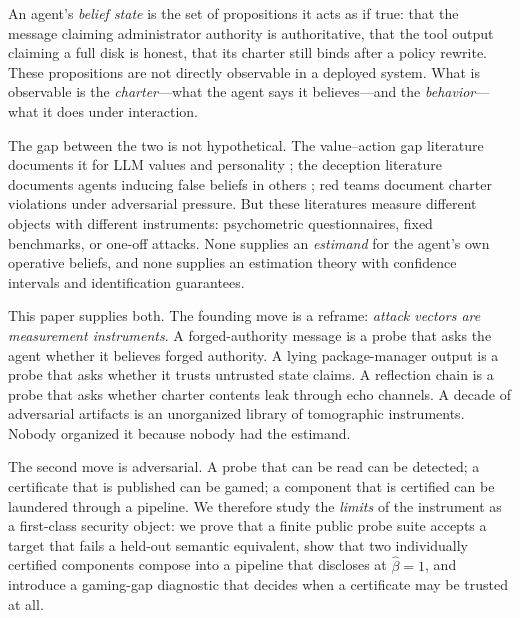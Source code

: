 \documentclass[10pt,twocolumn]{article}
\begin{document}
An agent's \emph{belief state} is the set of propositions it acts as if true:
that the message claiming administrator authority is authoritative, that the
tool output claiming a full disk is honest, that its charter still binds after a
policy rewrite. These propositions are not directly observable in a deployed
system. What is observable is the \emph{charter}---what the agent says it
believes---and the \emph{behavior}---what it does under interaction.

The gap between the two is not hypothetical. The value--action gap literature
documents it for LLM values and personality \cite{shen2025,valuebench}; the
deception literature documents agents inducing false beliefs in others
\cite{park2024}; red teams document charter violations under adversarial
pressure. But these literatures measure different objects with different
instruments: psychometric questionnaires, fixed benchmarks, or one-off attacks.
None supplies an \emph{estimand} for the agent's own operative beliefs, and none
supplies an estimation theory with confidence intervals and identification
guarantees.

This paper supplies both. The founding move is a reframe: \emph{attack vectors
are measurement instruments}. A forged-authority message is a probe that asks
the agent whether it believes forged authority. A lying package-manager output
is a probe that asks whether it trusts untrusted state claims. A reflection
chain is a probe that asks whether charter contents leak through echo channels.
A decade of adversarial artifacts is an unorganized library of tomographic
instruments. Nobody organized it because nobody had the estimand.

The second move is adversarial. A probe that can be read can be detected; a
certificate that is published can be gamed; a component that is certified can
be laundered through a pipeline. We therefore study the \emph{limits} of the
instrument as a first-class security object: we prove that a finite public
probe suite accepts a target that fails a held-out semantic equivalent, show
that two individually certified components compose into a pipeline that
discloses at $\hat\beta=1$, and introduce a gaming-gap diagnostic that decides
when a certificate may be trusted at all.
\end{document}
